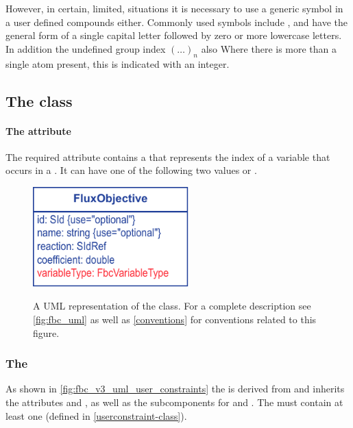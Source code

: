 However, in certain, limited, situations it is necessary to use a generic symbol in a user defined compounds either. Commonly used symbols include ,  and have the general form of
a single capital letter followed by zero or more lowercase letters. In addition the undefined group index $(\ldots)_n$ also Where there
is more than a single atom present, this is indicated with an integer. 


\subsection{The \FBC {} class}

\paragraph{The  attribute}
The required  attribute contains a  that
represents the index of a variable that occurs in a \FluxObjective. It can have one
of the following two values  or .
%
\begin{figure}[ht]
  \centering
  \includegraphics[width=6cm]{images/fbc_v3_uml_fobj.pdf}\\
  \caption{A UML representation of the \FBCPackage \FluxObjective class. For a complete description see \ref{fig:fbc_uml} as well as \ref{conventions} for conventions related to this figure.}
  \label{fig:fbc_uml_userconstraint}
\end{figure}

\subsubsection{The \FBC {}}
\label{listofuserconstraints-class}

As shown in \ref{fig:fbc_v3_uml_user_constraints} the \ListOfUserConstraints is derived from \SBase
and inherits the attributes  and , as well as
the subcomponents for \Annotation and \Notes. The
\ListOfUserConstraints must contain at least one \UserConstraint (defined in
\ref{userconstraint-class}).

